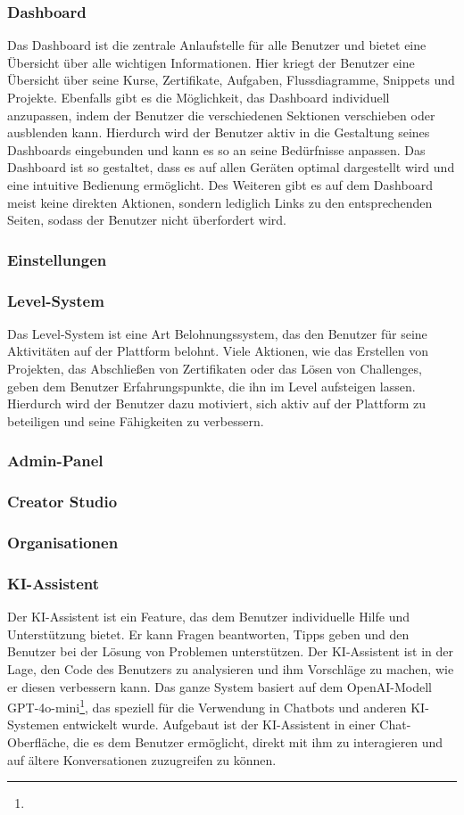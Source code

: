 \documentclass[main.tex]{subfiles}
\begin{document}
    \subsubsection{Dashboard}
    Das Dashboard ist die zentrale Anlaufstelle für alle Benutzer und bietet eine Übersicht über alle wichtigen Informationen.
    Hier kriegt der Benutzer eine Übersicht über seine Kurse, Zertifikate, Aufgaben, Flussdiagramme, Snippets und Projekte.
    Ebenfalls gibt es die Möglichkeit, das Dashboard individuell anzupassen, indem der Benutzer die verschiedenen Sektionen verschieben oder ausblenden kann.
    Hierdurch wird der Benutzer aktiv in die Gestaltung seines Dashboards eingebunden und kann es so an seine Bedürfnisse anpassen.
    Das Dashboard ist so gestaltet, dass es auf allen Geräten optimal dargestellt wird und eine intuitive Bedienung ermöglicht.
    Des Weiteren gibt es auf dem Dashboard meist keine direkten Aktionen, sondern lediglich Links zu den entsprechenden Seiten, sodass der Benutzer nicht überfordert wird.
    \subsubsection{Einstellungen}
    \subsubsection{Level-System}
    Das Level-System ist eine Art Belohnungssystem, das den Benutzer für seine Aktivitäten auf der Plattform belohnt.
    Viele Aktionen, wie das Erstellen von Projekten, das Abschließen von Zertifikaten oder das Lösen von Challenges, geben dem Benutzer Erfahrungspunkte, die ihn im Level aufsteigen lassen.
    Hierdurch wird der Benutzer dazu motiviert, sich aktiv auf der Plattform zu beteiligen und seine Fähigkeiten zu verbessern.
    \subsubsection{Admin-Panel}
    \subsubsection{Creator Studio}
    \subsubsection{Organisationen}
    \subsubsection{KI-Assistent}
    Der KI-Assistent ist ein Feature, das dem Benutzer individuelle Hilfe und Unterstützung bietet.
    Er kann Fragen beantworten, Tipps geben und den Benutzer bei der Lösung von Problemen unterstützen.
    Der KI-Assistent ist in der Lage, den Code des Benutzers zu analysieren und ihm Vorschläge zu machen, wie er diesen verbessern kann.
    Das ganze System basiert auf dem OpenAI-Modell GPT-4o-mini\footnote{}, das speziell für die Verwendung in Chatbots und anderen KI-Systemen entwickelt wurde.
    Aufgebaut ist der KI-Assistent in einer Chat-Oberfläche, die es dem Benutzer ermöglicht, direkt mit ihm zu interagieren und auf ältere Konversationen zuzugreifen zu können.
\end{document}
